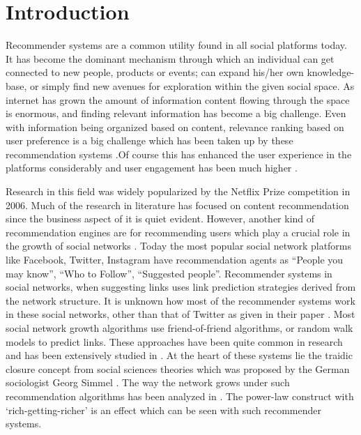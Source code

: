 \section{Introduction}

Recommender systems are a common utility found in all social platforms today. It has become the dominant mechanism through which an individual can get connected to new people, products or events; can expand his/her own knowledge-base, or simply find new avenues for exploration within the given social space. As internet has grown the amount of information content flowing through the space is enormous, and finding relevant information has become a big challenge. Even with information being organized based on content, relevance ranking based on user preference is a big challenge which has been taken up by these recommendation systems \cite{rashid2002getting}.Of course this has enhanced the user experience in the platforms considerably and user engagement has been much higher \cite{pu2011user,konstan2012recommender}.

Research in this field was widely popularized by the Netflix Prize competition \cite{netflixprize2006} in 2006. Much of the research in literature has focused on content recommendation since the business aspect of it is quiet evident. However, another kind of recommendation engines are for recommending users which play a crucial role in the growth of social networks \cite{su2016effect,daly2010network,stoica2018algorithmic}. Today the most popular social network platforms like Facebook, Twitter, Instagram have recommendation agents as ``People you may know'', ``Who to Follow'', ``Suggested people''. Recommender systems in social networks, when suggesting links uses link prediction strategies derived from the network structure. It is unknown how most of the recommender systems work in these social networks, other than that of Twitter as given in their paper \cite{gupta2013wtf}. Most social network growth algorithms use friend-of-friend algorithms, or random walk models to predict links. These approaches have been quite common in research and has been extensively studied in \cite{backstrom2011supervised,chen2009make,gupta2013wtf}. At the heart of these systems lie the traidic closure concept from social sciences theories which was proposed by the German sociologist Georg Simmel \cite{simmel1950sociology}. The way the network grows under such recommendation algorithms has been analyzed in \cite{su2016effect}. The power-law construct with `rich-getting-richer' is an effect which can be seen with such recommender systems.

